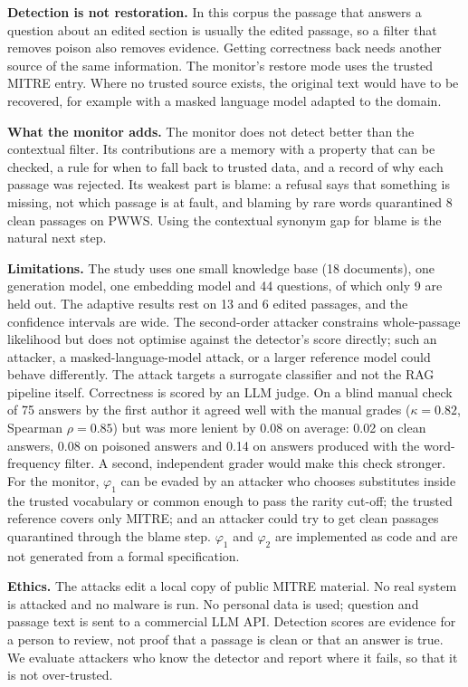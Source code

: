 \documentclass[10pt,journal,compsoc]{IEEEtran}
\begin{document}
\textbf{Detection is not restoration.} In this corpus the passage that answers a question about an edited section is usually the edited passage, so a filter that removes poison also removes evidence. Getting correctness back needs another source of the same information. The monitor's restore mode uses the trusted MITRE entry. Where no trusted source exists, the original text would have to be recovered, for example with a masked language model adapted to the domain.

\textbf{What the monitor adds.} The monitor does not detect better than the contextual filter. Its contributions are a memory with a property that can be checked, a rule for when to fall back to trusted data, and a record of why each passage was rejected. Its weakest part is blame: a refusal says that something is missing, not which passage is at fault, and blaming by rare words quarantined 8 clean passages on PWWS. Using the contextual synonym gap for blame is the natural next step.

\textbf{Limitations.} The study uses one small knowledge base (18 documents), one generation model, one embedding model and 44 questions, of which only 9 are held out. The adaptive results rest on 13 and 6 edited passages, and the confidence intervals are wide. The second-order attacker constrains whole-passage likelihood but does not optimise against the detector's score directly; such an attacker, a masked-language-model attack, or a larger reference model could behave differently. The attack targets a surrogate classifier and not the RAG pipeline itself. Correctness is scored by an LLM judge. On a blind manual check of 75 answers by the first author it agreed well with the manual grades ($\kappa=0.82$, Spearman $\rho=0.85$) but was more lenient by 0.08 on average: 0.02 on clean answers, 0.08 on poisoned answers and 0.14 on answers produced with the word-frequency filter. A second, independent grader would make this check stronger. For the monitor, $\varphi_1$ can be evaded by an attacker who chooses substitutes inside the trusted vocabulary or common enough to pass the rarity cut-off; the trusted reference covers only MITRE; and an attacker could try to get clean passages quarantined through the blame step. $\varphi_1$ and $\varphi_2$ are implemented as code and are not generated from a formal specification.

\textbf{Ethics.} The attacks edit a local copy of public MITRE material. No real system is attacked and no malware is run. No personal data is used; question and passage text is sent to a commercial LLM API. Detection scores are evidence for a person to review, not proof that a passage is clean or that an answer is true. We evaluate attackers who know the detector and report where it fails, so that it is not over-trusted.
\end{document}
